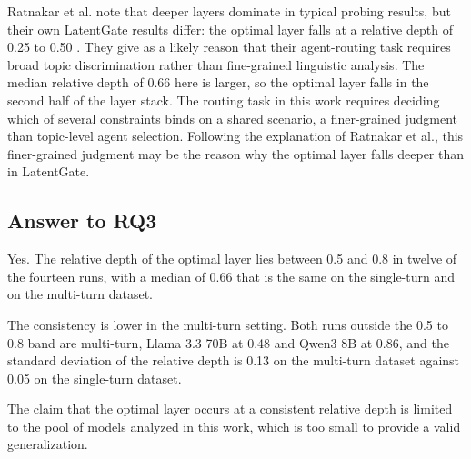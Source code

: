 Ratnakar et al. note that deeper layers dominate in typical probing results, but their own LatentGate results differ: the optimal layer falls at a relative depth of 0.25 to 0.50 \cite{ratnakarLatentGateLowLatencySemantic2026}. They give as a likely reason that their agent-routing task requires broad topic discrimination rather than fine-grained linguistic analysis. The median relative depth of 0.66 here is larger, so the optimal layer falls in the second half of the layer stack. The routing task in this work requires deciding which of several constraints binds on a shared scenario, a finer-grained judgment than topic-level agent selection. Following the explanation of Ratnakar et al., this finer-grained judgment may be the reason why the optimal layer falls deeper than in LatentGate.

\subsection{Answer to RQ3}
\label{subsec:ch8-rq3-answer}

\label{rq:ch8-rq3}


\noindent Yes. The relative depth of the optimal layer lies between 0.5 and 0.8 in twelve of the fourteen runs, with a median of 0.66 that is the same on the single-turn and on the multi-turn dataset.

The consistency is lower in the multi-turn setting. Both runs outside the 0.5 to 0.8 band are multi-turn, Llama 3.3 70B at 0.48 and Qwen3 8B at 0.86, and the standard deviation of the relative depth is 0.13 on the multi-turn dataset against 0.05 on the single-turn dataset.

The claim that the optimal layer occurs at a consistent relative depth is limited to the pool of models analyzed in this work, which is too small to provide a valid generalization.

\FloatBarrier
